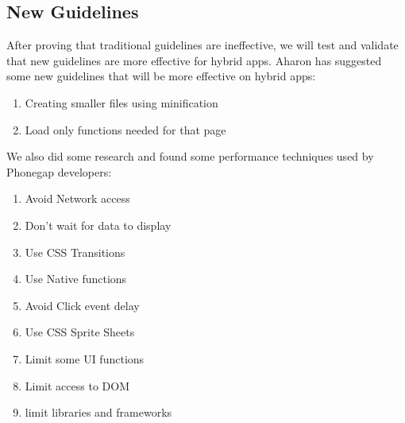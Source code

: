\documentclass{acm_proc_article-sp}
\begin{document}
\subsection{New Guidelines}
After proving that traditional guidelines are ineffective, we will test and validate that new guidelines are more effective for hybrid apps.
Aharon has suggested some new guidelines that will be more effective on hybrid apps:
\vspace{-1.0em}
\begin{enumerate}\itemsep1pt \parskip0pt 
	\item Creating smaller files using minification
	\item Load only functions needed for that page
\end{enumerate}
We also did some research and found some performance techniques used by Phonegap developers:
\vspace{-1.0em}
\begin{enumerate}\itemsep1pt \parskip0pt 
	\item Avoid Network access
	\item Don't wait for data to display
	\item Use CSS Transitions
	\item Use Native functions
	\item Avoid Click event delay
	\item Use CSS Sprite Sheets
	\item Limit some UI functions
	\item Limit access to DOM
	\item limit libraries and frameworks
\end{enumerate}
\end{document}
